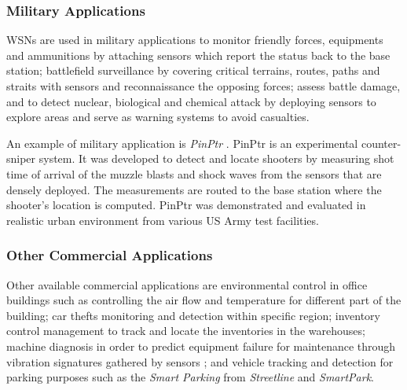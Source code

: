 \subsubsection{Military Applications}
WSNs are used in military applications to monitor friendly forces, equipments and ammunitions by attaching sensors which report the status back to the base station; battlefield surveillance by covering critical terrains, routes, paths and straits with sensors and reconnaissance the opposing forces; assess battle damage, and to detect nuclear, biological and chemical attack by deploying sensors to explore areas and serve as warning systems to avoid casualties.
  

An example of military application is \textit{PinPtr} \cite{Simonpinptr}. PinPtr is an experimental counter-sniper system. It was developed to detect and locate shooters by measuring shot time of arrival of the muzzle blasts and shock waves from the sensors that are densely deployed. The measurements are routed to the base station where the shooter's location is computed. PinPtr was demonstrated and evaluated in realistic urban environment from various US Army test facilities.


\subsubsection{Other Commercial Applications}
Other available commercial applications are environmental control in office buildings such as controlling the air flow and temperature for different part of the building; car thefts monitoring and detection within specific region; inventory control management to track and locate the inventories in the warehouses; machine diagnosis in order to predict equipment failure for maintenance through vibration signatures gathered by sensors \cite{industrialsensor}; and vehicle tracking and detection for parking purposes such as the \textit{Smart Parking} from \textit{Streetline} and \textit{SmartPark}. 

